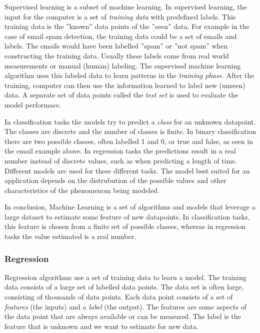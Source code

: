 Supervised learning is a subset of machine learning. In supervised learning, the input for the computer is a set of \textit{training data} with predefined labels. 
This training data is the ''known'' data points of the ''seen'' data.
For example in the case of email spam detection, the training data could be a set of emails and labels.
The emails would have been labelled ''spam'' or ''not spam'' when constructing the training data. 
Usually these labels come from real world measurements or manual (human) labeling.
The supervised machine learning algorithm uses this labeled data to learn patterns in the \emph{training phase}. After the training, computer can then use the information learned to label new (unseen) data.
A separate set of data points called the \emph{test set} is used to evaluate the model performace.


In classification tasks the models try to predict a \emph{class} for an unknown datapoint. The classes are discrete and the number of classes is finite. In binary classification there are two possible classes, often labelled 1 and 0, or true and false, as seen in the email example above. In regression tasks the predictions result in a real number instead of discrete values, such as when predicting a length of time.
Different models are used for these different tasks.
The model best suited for an application depends on the distrubution of the possible values and other characteristics of the phenomenom being modeled.

In conclusion, Machine Learning is a set of algorithms and models that leverage a large dataset to estimate some feature of new datapoints.
In classification tasks, this feature is chosen from a finite set of possible classes, whereas in regression tasks the value estimated is a real number.

\subsubsection{Regression}

Regression algorithms use a set of training data to learn a model.
The training data consists of a large set of labelled data points.
The data set is often large, consisting of thousands of data points.
Each data point consists of a set of \emph{features} (the inputs) and a \emph{label} (the output).
The features are some aspects of the data point that are always available or can be measured.
The label is the feature that is unknown and we want to estimate for new data.


